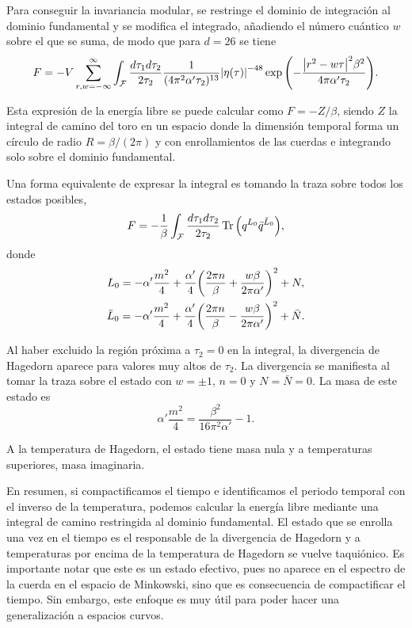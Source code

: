 Para conseguir la invariancia modular, se restringe el dominio de integración al dominio
fundamental y se modifica el integrado, añadiendo el número cuántico $w$ sobre el que 
se suma, de modo que para $d=26$ se tiene
\begin{equation}
  F=-V \sum_{r,w=-\infty}^{\infty} \int_\mathcal{F}  \frac{d\tau_1d\tau_2}{2\tau_2}   \frac{1}{(4\pi^2\alpha'\tau_2)^{13}}
  \abs{\eta(\tau)}^{-48}\exp\qty(-\frac{\abs{r^2-w\tau}^2\beta^2}{4\pi\alpha'\tau_2}).
  \label{eq:fund}
\end{equation}

Esta expresión de la energía libre se puede calcular como $F=-Z/\beta$, siendo $Z$ la integral de camino del toro en
un espacio donde la dimensión temporal forma un círculo de radio $R=\beta/(2\pi)$ y con enrollamientos
de las cuerdas e integrando solo sobre el dominio fundamental.

Una forma equivalente de expresar la integral es tomando la traza sobre todos los estados posibles,
\begin{equation}
  F =-\frac{1}{\beta} \int_{\mathcal F} \frac{d\tau_1 d\tau_2}{2\tau_2} \Tr\qty(q^{L_0} \bar q^{\bar L_0}),
\end{equation}
donde 
\begin{equation}
  \begin{gathered}
         L_0 =  -\alpha'\frac{m^2}{4} + \frac{\alpha'}{4}\qty(\frac{2\pi n}{\beta} + \frac{w\beta}{2\pi\alpha'})^2 + N,\\
    \bar L_0 =  -\alpha'\frac{m^2}{4} + \frac{\alpha'}{4}\qty(\frac{2\pi n}{\beta} - \frac{w\beta}{2\pi\alpha'})^2 +\bar N.
  \end{gathered}
\end{equation}

Al haber excluido la región próxima a $\tau_2=0$ en la integral, la divergencia de Hagedorn aparece para
valores muy altos de $\tau_2$.
La divergencia se manifiesta al tomar la traza sobre el estado con $w=\pm 1$, $n=0$ y $N=\bar N=0$.
La masa de este estado es
\begin{equation}
  \alpha' \frac{m^2}{4} = \frac{\beta^2}{16\pi^2\alpha'} -1.
\end{equation}

A la temperatura de Hagedorn, el estado tiene masa nula y a temperaturas superiores, masa
imaginaria.

En resumen, si compactificamos el tiempo e identificamos el periodo temporal con el inverso de la
temperatura, podemos calcular la energía libre mediante una integral de camino restringida
al dominio fundamental.
El estado que se enrolla una vez en el tiempo es el responsable de la divergencia de Hagedorn y
a temperaturas por encima de la temperatura de Hagedorn se vuelve taquiónico.
Es importante notar que este es un estado efectivo, pues no aparece en el espectro de la cuerda en 
el espacio de Minkowski, sino que es consecuencia de compactificar el tiempo.
Sin embargo, este enfoque es muy útil para poder hacer una generalización a espacios curvos.
